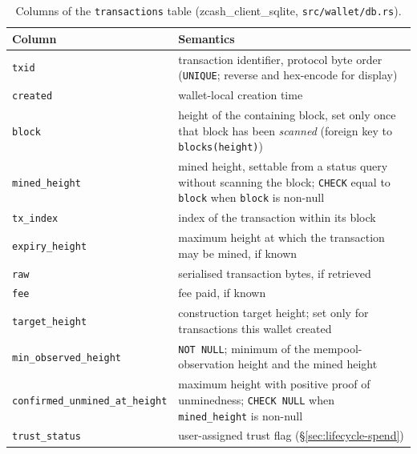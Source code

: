 \documentclass[11pt,a4paper]{article}
\theoremstyle{definition}
\begin{document}
\begin{table}[htbp]
\centering\small
\begin{tabular}{@{}lp{10.2cm}@{}}
\toprule
Column & Semantics \\
\midrule
\texttt{txid} & transaction identifier, protocol byte order
  (\texttt{UNIQUE}; reverse and hex-encode for display) \\
\texttt{created} & wallet-local creation time \\
\texttt{block} & height of the containing block, set only once that block
  has been \emph{scanned} (foreign key to \texttt{blocks(height)}) \\
\texttt{mined\_height} & mined height, settable from a status query without
  scanning the block; \texttt{CHECK} equal to \texttt{block} when
  \texttt{block} is non-null \\
\texttt{tx\_index} & index of the transaction within its block \\
\texttt{expiry\_height} & maximum height at which the transaction may be
  mined, if known \\
\texttt{raw} & serialised transaction bytes, if retrieved \\
\texttt{fee} & fee paid, if known \\
\texttt{target\_height} & construction target height; set only for
  transactions this wallet created \\
\texttt{min\_observed\_height} & \texttt{NOT NULL}; minimum of the
  mempool-observation height and the mined height \\
\texttt{confirmed\_unmined\_at\_height} & maximum height with positive
  proof of unminedness; \texttt{CHECK NULL} when \texttt{mined\_height} is
  non-null \\
\texttt{trust\_status} & user-assigned trust flag
  (\S\ref{sec:lifecycle-spend}) \\
\bottomrule
\end{tabular}
\caption{Columns of the \texttt{transactions} table
(\textsf{zcash\_client\_sqlite}, \texttt{src/wallet/db.rs}).}
\label{tab:tx-table}
\end{table}
\end{document}
